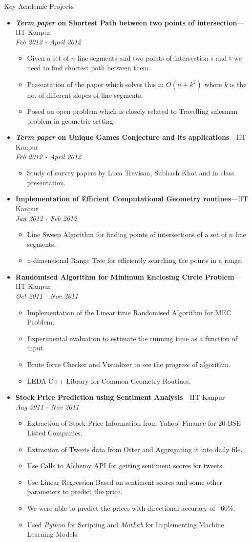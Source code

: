 \documentclass[11pt,oneside]{article}
\newenvironment{ressection}[1]{
	\vspace{4pt}
	{\fontfamily{phv}\selectfont\Large#1}
	\begin{itemize}
	\vspace{3pt}
}{
	\end{itemize}
}
\newcommand{\ressubitem}[1]{
	\vspace{-1pt}
	\item \begin{flushleft} #1 \end{flushleft}
}
\newcommand{\resbigitem}[3]{
	\vspace{-5pt}
	\item
	\textbf{#1}---#2 \\
	\textit{#3}
}
\newenvironment{ressubsec}[3]{
	\resbigitem{#1}{#2}{#3}
	\vspace{-2pt}
	\begin{itemize}
}{
	\end{itemize}
}
\begin{document}
\begin{ressection}{Key Academic Projects}

  \begin{ressubsec}{\textit{Term paper} on Shortest Path between two points of intersection}{IIT Kanpur}{Feb 2012 - April 2012}
   \ressubitem{Given a set of $n$ line segments and two points of intersection s and t we need to find shortest path between them.}
   \ressubitem{Presentation of the paper which solves this in $O(n + k^2)$ where $k$ is the no. of different slopes of line segments.}
   \ressubitem{Posed an open problem which is closely related to Travelling salesman problem in geometric setting. }
  \end{ressubsec}


  \begin{ressubsec}{\textit{Term paper} on Unique Games Conjecture and its applications}{IIT Kanpur}{Feb 2012 - April 2012}
   \ressubitem{Study of survey papers by Luca Trevisan, Subhash Khot and in class presentation.}
  \end{ressubsec}

  \begin{ressubsec}{Implementation of Efficient Computational Geometry routines}{IIT Kanpur}{Jan 2012 - Feb 2012}
   \ressubitem{Line Sweep Algorithm for finding points of intersections of a set of $n$ line segments.}
   \ressubitem{n-dimensional Range Tree for efficiently searching the points in a range.}
  \end{ressubsec}

  \begin{ressubsec}{Randomised Algorithm for Minimum Enclosing Circle Problem}{IIT Kanpur}{Oct 2011 - Nov 2011}
    
    \ressubitem{ Implementation of the Linear time Randomised Algorithm for MEC Problem. }
    \ressubitem{ Experimental evaluation to estimate the running time as a function of input. }
    \ressubitem{ Brute force Checker and Visualizer to see the progress of algorithm. }
    \ressubitem{ LEDA C++ Library for Common Geometry Routines.}
  \end{ressubsec}

  \begin{ressubsec}{Stock Price Prediction using Sentiment Analysis}{IIT Kanpur}{Aug 2011 - Nov 2011}
    
    \ressubitem{ Extraction of Stock Price Information from Yahoo! Finance for 20 BSE Listed Companies.}
    \ressubitem{ Extraction of Tweets data from Otter and Aggregating it into daily file.  }
    \ressubitem{ Use Calls to Alchemy API for getting sentiment scores for tweets. }
    \ressubitem{ Use Linear Regression Based on sentiment scores and some other parameters to predict the price.}
    \ressubitem{ We were able to predict the prices with directional accuracy of ~60\%.}
    \ressubitem{ Used \textit{Python} for Scripting and \textit{MatLab} for Implementing Machine Learning Models.}


\end{ressubsec}
\end{ressection}
\end{document}
